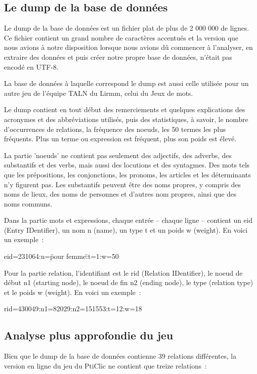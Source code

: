 \documentclass[a4paper,11pt,french]{article}
\begin{document}
\subsection{Le dump de la base de données}

Le dump de la base de données est un fichier plat de plus de 2 000 000 de lignes. Ce fichier contient un grand nombre de caractères accentués et la version que nous avions à notre disposition lorsque nous avions dû commencer à l'analyser, en extraire des données et puis créer notre propre base de données, n'était pas encodé en UTF-8.

La base de données à laquelle correspond le dump est aussi celle utilisée pour un autre jeu de l'équipe TALN du Lirmm, celui du Jeux de mots. 

Le dump contient en tout début des remerciements et quelques explications des acronymes et des abbréviations utilisés, puis des statistiques, à savoir, le nombre d'occurrences de relations, la fréquence des noeuds, les 50 termes les plus fréquents. Plus un terme ou expression est fréquent, plus son poids est élevé. 


La partie 'noeuds' ne contient pas seulement des adjectifs, des adverbs, des substantifs et des verbs, mais aussi des locutions et des syntagmes. Des mots tels que les prépositions, les conjonctions, les pronoms, les articles et les déterminants n'y figurent pas. Les substantifs peuvent être des noms propres, y compris des noms de lieux, des noms de personnes et d'autres nom propres, ainsi que des noms communs. 

Dans la partie mots et expressions, chaque entrée -- chaque ligne -- contient un eid (Entry IDentifier), un nom n (name), un type t et un poids w (weight). En voici un exemple~:

eid=231064:n=\"pour femme\":t=1:w=50

Pour la partie relation, l'identifiant est le rid (Relation IDentifier), le noeud de début n1 (starting node), le noeud de fin n2 (ending node), le type (relation type) et le poids w (weight). En voici un exemple~:

rid=430049:n1=82029:n2=151553:t=12:w=18


\subsection{Analyse plus approfondie du jeu}
Bien que le dump de la base de données contienne 39 relations différentes, la version en ligne du jeu du PtiClic ne contient que treize relations~:
\end{document}
